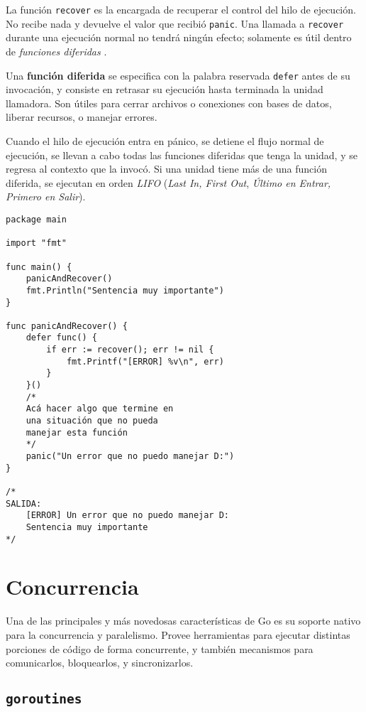 La función \texttt{recover} es la encargada de recuperar el control del hilo de ejecución. No recibe nada y devuelve el valor que recibió \texttt{panic}.  Una llamada a \texttt{recover} durante una ejecución normal no tendrá ningún efecto; solamente es útil dentro de \emph{funciones diferidas} \autocite{BlogGolangDeferPanicRecover}.  

Una \textbf{función diferida} se especifica con la palabra reservada \texttt{defer} antes de su invocación, y consiste en retrasar su ejecución hasta terminada la unidad llamadora. Son útiles para cerrar archivos o conexiones con bases de datos, liberar recursos, o manejar errores.

Cuando el hilo de ejecución entra en pánico, se detiene el flujo normal de ejecución, se llevan a cabo todas las funciones diferidas que tenga la unidad, y se regresa al contexto que la invocó. Si una unidad tiene más de una función diferida, se ejecutan en orden \emph{LIFO} (\emph{Last In, First Out}, \emph{Último en Entrar, Primero en Salir}).

\pagebreak

\begin{lstlisting}[title={\emph{Defer, Panic, Recover} \autocite{MediumDeferPanicRecover}}]
package main

import "fmt"

func main() {
    panicAndRecover()
    fmt.Println("Sentencia muy importante")
}

func panicAndRecover() {
    defer func() {
        if err := recover(); err != nil {
            fmt.Printf("[ERROR] %v\n", err)
        }
    }()
    /*
    Acá hacer algo que termine en 
    una situación que no pueda
    manejar esta función
    */
    panic("Un error que no puedo manejar D:")
}

/*
SALIDA:
    [ERROR] Un error que no puedo manejar D:
    Sentencia muy importante
*/
\end{lstlisting}

\section{Concurrencia}

Una de las principales y más novedosas características de Go es su soporte nativo para la concurrencia y paralelismo. Provee herramientas para ejecutar distintas porciones de código de forma concurrente, y también mecanismos para comunicarlos, bloquearlos, y sincronizarlos.

\subsection{\texttt{goroutines}}

